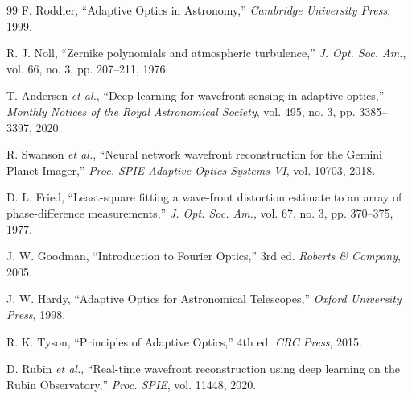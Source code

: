 \documentclass[twocolumn,10pt]{IEEEtran}
\begin{document}
\begin{thebibliography}{99}
F. Roddier, ``Adaptive Optics in Astronomy,'' \textit{Cambridge University Press}, 1999.

R. J. Noll, ``Zernike polynomials and atmospheric turbulence,'' \textit{J. Opt. Soc. Am.}, vol. 66, no. 3, pp. 207--211, 1976.

T. Andersen \textit{et al.}, ``Deep learning for wavefront sensing in adaptive optics,'' \textit{Monthly Notices of the Royal Astronomical Society}, vol. 495, no. 3, pp. 3385--3397, 2020.

R. Swanson \textit{et al.}, ``Neural network wavefront reconstruction for the Gemini Planet Imager,'' \textit{Proc. SPIE Adaptive Optics Systems VI}, vol. 10703, 2018.

D. L. Fried, ``Least-square fitting a wave-front distortion estimate to an array of phase-difference measurements,'' \textit{J. Opt. Soc. Am.}, vol. 67, no. 3, pp. 370--375, 1977.

J. W. Goodman, ``Introduction to Fourier Optics,'' 3rd ed. \textit{Roberts \& Company}, 2005.

J. W. Hardy, ``Adaptive Optics for Astronomical Telescopes,'' \textit{Oxford University Press}, 1998.

R. K. Tyson, ``Principles of Adaptive Optics,'' 4th ed. \textit{CRC Press}, 2015.

D. Rubin \textit{et al.}, ``Real-time wavefront reconstruction using deep learning on the Rubin Observatory,'' \textit{Proc. SPIE}, vol. 11448, 2020.
\end{thebibliography}
\end{document}
